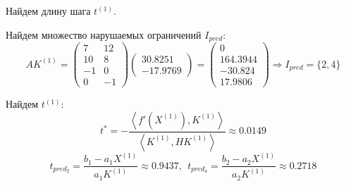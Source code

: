 Найдем длину шага $t^{(1)}$.

Найдем множество нарушаемых ограничений $I_{pred}$:
\begin{equation*}
A K^{(1)} = \begin{pmatrix}
	7 & 12 \\
	10 & 8 \\
	-1 & 0 \\
	0 & -1
\end{pmatrix} \begin{pmatrix}
	30.8251 \\ 
	-17.9769
\end{pmatrix} = \begin{pmatrix}
	0 \\
	164.3944 \\
	-30.824 \\
	17.9806
\end{pmatrix}
\Longrightarrow
I_{pred} = \{2, 4\}
\end{equation*}

Найдем $t^{(1)}$:
\vspace{-0.9cm}
\begin{equation*}
t^* = - \dfrac{\left\langle f'(X^{(1)}), K^{(1)} \right\rangle}{\left\langle K^{(1)}, HK^{(1)} \right\rangle} \approx 0.0149
\end{equation*}
\begin{equation*}
t_{pred_2} = \dfrac{b_1 - a_1 X^{(1)}}{a_1 K^{(1)}} \approx 0.9437,\ \ 
t_{pred_4} = \dfrac{b_2 - a_2 X^{(1)}}{a_2 K^{(1)}} \approx 0.2718
\end{equation*}

